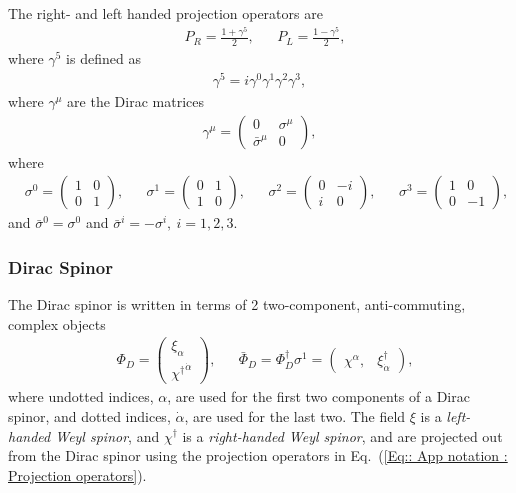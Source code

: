 \documentclass[twoside,english]{uiofysmaster}
\begin{document}
{\begin{appendices}
The right- and left handed projection operators are
\begin{align}\label{Eq:: App notation : Projection operators}
&P_R = \frac{1+ \gamma^5}{2},&&P_L = \frac{1-\gamma^5}{2}, 
\end{align}
where $\gamma^5$ is defined as 
\begin{align}
\gamma^5 = i \gamma^0 \gamma^1 \gamma^2 \gamma^3,
\end{align}
where $\gamma^{\mu}$ are the Dirac matrices
\begin{align}
\gamma^{\mu} = \begin{pmatrix}
0 & \sigma^{\mu}\\
\bar{\sigma}^{\mu} & 0
\end{pmatrix},
\end{align}
where
\begin{align}
&\sigma^0 =  \begin{pmatrix}
1 & 0\\
0 & 1
\end{pmatrix},
&& \sigma^1 =  \begin{pmatrix}
0 & 1\\
1 & 0
\end{pmatrix},
&& \sigma^2 =  \begin{pmatrix}
0 & -i\\
i & 0
\end{pmatrix},
&& \sigma^3 = \begin{pmatrix}
1 & 0\\
0 & -1
\end{pmatrix},
\end{align}
and $\bar{\sigma}^0 = \sigma^0$ and $\bar{\sigma}^i = -\sigma^i,~i=1,2,3$.

\subsubsection{Dirac Spinor}
The Dirac spinor is written in terms of 2 two-component, anti-commuting, complex objects
\begin{align}
&\Phi_D = \begin{pmatrix}
\xi_{\alpha}\\
{\chi^{\dagger}}^{\dot{\alpha}}
\end{pmatrix},
&& \bar{\Phi}_D = \Phi^{\dagger}_D \sigma^1 = \begin{pmatrix}
\chi^{\alpha}, & \xi_{\dot{\alpha}}^{\dagger}
\end{pmatrix},
\end{align} 
where undotted indices, $\alpha$, are used for the first two components of a Dirac spinor, and dotted indices, $\dot{\alpha}$, are used for the last two. The field $\xi$ is a \textit{left-handed Weyl spinor}, and $\chi^{\dagger}$ is a \textit{right-handed Weyl spinor}, and are projected out from the Dirac spinor using the projection operators in Eq.~(\ref{Eq:: App notation : Projection operators}).


\end{appendices}}
\end{document}
